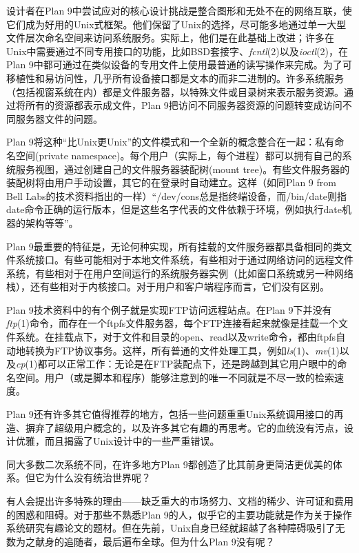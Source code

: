 \documentclass[12pt,oneside]{ctexbook}
\begin{document}
\begin{common-format}
设计者在Plan 9中尝试应对的核心设计挑战是整合图形和无处不在的网络互联，使它们成为好用的Unix式框架。他们保留了Unix的选择，尽可能多地通过单一大型文件层次命名空间来访问系统服务。实际上，他们是在此基础上改进；许多在Unix中需要通过不同专用接口的功能，比如BSD套接字、\textit{fcntl}(2)以及\textit{ioctl}(2)，在Plan 9中都可通过在类似设备的专用文件上使用最普通的读写操作来完成。为了可移植性和易访问性，几乎所有设备接口都是文本的而非二进制的。许多系统服务（包括视窗系统在内）都是文件服务器，以特殊文件或目录树来表示服务资源。通过将所有的资源都表示成文件，Plan 9把访问不同服务器资源的问题转变成访问不同服务器文件的问题。

Plan 9将这种“比Unix更Unix”的文件模式和一个全新的概念整合在一起：私有命名空间(private namespace)。每个用户（实际上，每个进程）都可以拥有自己的系统服务视图，通过创建自己的文件服务器装配树(mount tree)。有些文件服务器的装配树将由用户手动设置，其它的在登录时自动建立。这样（如同Plan 9 from Bell Labs的技术资料指出的一样）“/dev/cons总是指终端设备，而/bin/date则指date命令正确的运行版本，但是这些名字代表的文件依赖于环境，例如执行date机器的架构等等”。

Plan 9最重要的特征是，无论何种实现，所有挂载的文件服务器都具备相同的类文件系统接口。有些可能相对于本地文件系统，有些相对于通过网络访问的远程文件系统，有些相对于在用户空间运行的系统服务器实例（比如窗口系统或另一种网络栈），还有些相对于内核接口。对于用户和客户端程序而言，它们没有区别。

Plan 9技术资料中的有个例子就是实现FTP访问远程站点。在Plan 9下并没有\textit{ftp}(1)命令，而存在一个ftpfs文件服务器，每个FTP连接看起来就像是挂载一个文件系统。在挂载点下，对于文件和目录的open、read以及write命令，都由ftpfs自动地转换为FTP协议事务。这样，所有普通的文件处理工具，例如\textit{ls}(1)、\textit{mv}(1)以及\textit{cp}(1)都可以正常工作：无论是在FTP装配点下，还是跨越到其它用户眼中的命名空间。用户（或是脚本和程序）能够注意到的唯一不同就是不尽一致的检索速度。

Plan 9还有许多其它值得推荐的地方，包括一些问题重重Unix系统调用接口的再造、摒弃了超级用户概念的，以及许多其它有趣的再思考。它的血统没有污点，设计优雅，而且揭露了Unix设计中的一些严重错误。

同大多数二次系统不同，在许多地方Plan 9都创造了比其前身更简洁更优美的体系。但它为什么没有统治世界呢？

有人会提出许多特殊的理由——缺乏重大的市场努力、文档的稀少、许可证和费用的困惑和阻碍。对于那些不熟悉Plan 9的人，似乎它的主要功能就是作为关于操作系统研究有趣论文的题材。但在先前，Unix自身已经就超越了各种障碍吸引了无数为之献身的追随者，最后遍布全球。但为什么Plan 9没有呢？


\end{common-format}
\end{document}
